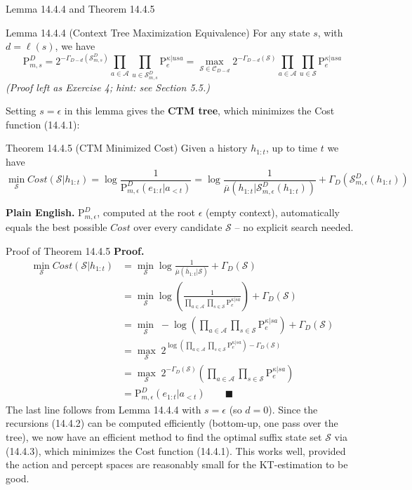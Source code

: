 \documentclass[aspectratio=169,10pt]{beamer}
\newcommand{\Sc}{\mathcal{S}}
\newcommand{\Ac}{\mathcal{A}}
\begin{document}
\begin{frame}{Lemma 14.4.4 and Theorem 14.4.5}
  \begin{block}{Lemma 14.4.4 (Context Tree Maximization Equivalence)}
    For any state $s$, with $d=\ell(s)$, we have
    \[
      \mathrm{P}^D_{m,s} = 2^{-\Gamma_{D-d}(\Sc^D_{m,s})}\prod_{a\in\Ac}\prod_{u\in\Sc^D_{m,s}}\mathrm{P}_e^{\kappa|usa}
      = \max_{\Sc\in\mathcal{C}_{D-d}} 2^{-\Gamma_{D-d}(\Sc)}\prod_{a\in\Ac}\prod_{u\in\Sc}\mathrm{P}_e^{\kappa|usa}
    \]
    \emph{(Proof left as Exercise 4; hint: see Section 5.5.)}
  \end{block}
  Setting $s=\epsilon$ in this lemma gives the \textbf{CTM tree}, which
  minimizes the Cost function (14.4.1):
  \begin{block}{Theorem 14.4.5 (CTM Minimized Cost)}
    Given a history $h_{1:t}$, up to time $t$ we have
    \[
      \min_\Sc \mathit{Cost}(\Sc|h_{1:t}) = \log\frac{1}{\mathrm{P}^D_{m,\epsilon}(e_{1:t}|a_{<t})}
      = \log\frac{1}{\overline\mu(h_{1:t}|\Sc^D_{m,\epsilon}(h_{1:t}))} + \Gamma_D(\Sc^D_{m,\epsilon}(h_{1:t}))
    \]
  \end{block}
  \textbf{Plain English.} $\mathrm{P}^D_{m,\epsilon}$, computed at the root
  $\epsilon$ (empty context), automatically equals the best possible
  $Cost$ over every candidate $\Sc$ -- no explicit search needed.
\end{frame}

\begin{frame}[allowframebreaks]{Proof of Theorem 14.4.5}
  \textbf{Proof.}
  \begin{align*}
    \min_\Sc \mathit{Cost}(\Sc|h_{1:t})
      &= \min_\Sc \log\frac{1}{\overline\mu(\overline h_{1:t}|\Sc)}+\Gamma_D(\Sc)\\
      &= \min_\Sc \log\left(\frac{1}{\prod_{a\in\Ac}\prod_{s\in\Sc}\mathrm{P}_e^{\kappa|sa}}\right)+\Gamma_D(\Sc)\\
      &= \min_\Sc\; -\log\left(\prod_{a\in\Ac}\prod_{s\in\Sc}\mathrm{P}_e^{\kappa|sa}\right)+\Gamma_D(\Sc)\\
      &= \max_\Sc\; 2^{\log(\prod_{a\in\Ac}\prod_{s\in\Sc}\mathrm{P}_e^{\kappa|sa})-\Gamma_D(\Sc)}\\
      &= \max_\Sc\; 2^{-\Gamma_D(\Sc)}\left(\prod_{a\in\Ac}\prod_{s\in\Sc}\mathrm{P}_e^{\kappa|sa}\right)\\
      &= \mathrm{P}^D_{m,\epsilon}(e_{1:t}|a_{<t}) \qquad\blacksquare
  \end{align*}
  The last line follows from Lemma 14.4.4 with $s=\epsilon$ (so $d=0$).
  Since the recursions (14.4.2) can be computed efficiently (bottom-up,
  one pass over the tree), we now have an efficient method to find the
  optimal suffix state set $\Sc$ via (14.4.3), which minimizes the Cost
  function (14.4.1). This works well, provided the action and percept
  spaces are reasonably small for the KT-estimation to be good.
\end{frame}
\end{document}
